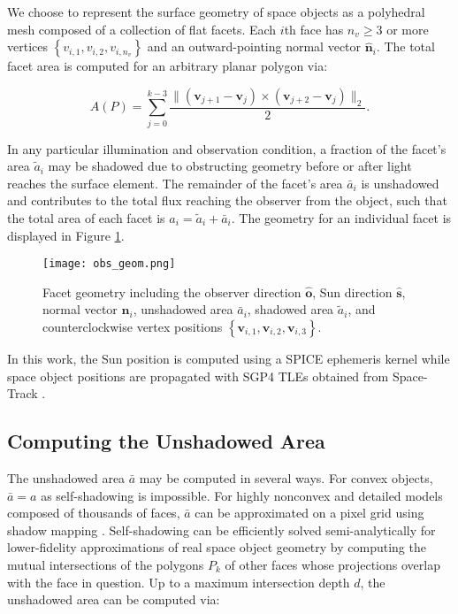 \documentclass[a4paper,twocolumn]{spaceDebrisC} %
\newcommand{\vctr}[1]{\bm{#1}}
\newcommand{\unitv}[1]{\hat{\vctr{#1}}}
\newcommand{\figmed}[0]{0.4\textwidth}
\begin{document}
We choose to represent the surface geometry of space objects as a polyhedral mesh composed of a collection of flat facets. Each $i$th face has $n_v \geq 3$ or more vertices $\left\{ v_{i,1}, v_{i,2}, v_{i,n_v} \right\}$ and an outward-pointing normal vector $\unitv{n}_i$. The total facet area is computed for an arbitrary planar polygon via:

\begin{equation} \label{eq:poly_area}
 A(P) = \sum_{j=0}^{k-3} \frac{\| \left( \vctr{v}_{j+1} - \vctr{v}_{j} \right) \times \left( \vctr{v}_{j+2} - \vctr{v}_{j} \right)\|_2}{2}.
 \end{equation} 
 
 In any particular illumination and observation condition, a fraction of the facet's area $\tilde{a}_i$ may be shadowed due to obstructing geometry before or after light reaches the surface element. The remainder of the facet's area $\bar{a}_i$ is unshadowed and contributes to the total flux reaching the observer from the object, such that the total area of each facet is $a_i = \tilde{a}_i + \bar{a}_i$. The geometry for an individual facet is displayed in Figure \ref{fig:facet_geom}.

\begin{figure}[H]
  \centering
  \texttt{[image: obs\_geom.png]}
  \caption{Facet geometry including the observer direction $\unitv{o}$, Sun direction $\unitv{s}$, normal vector $\unitv{n}_i$, unshadowed area $\bar{a}_i$, shadowed area $\tilde{a}_i$, and counterclockwise vertex positions $\left\{ \vctr{v}_{i,1}, \vctr{v}_{i,2}, \vctr{v}_{i,3} \right\}$.}
  \label{fig:facet_geom}
\end{figure}

In this work, the Sun position is computed using a SPICE ephemeris kernel \cite{spice} while space object positions are propagated with SGP4 TLEs obtained from Space-Track \cite{spacetrack}.

\subsection{Computing the Unshadowed Area}

The unshadowed area $\bar{a}$ may be computed in several ways. For convex objects, $\bar{a}=a$ as self-shadowing is impossible. For highly nonconvex and detailed models composed of thousands of faces, $\bar{a}$ can be approximated on a pixel grid using shadow mapping \cite{robinson2022}. Self-shadowing can be efficiently solved semi-analytically for lower-fidelity approximations of real space object geometry by computing the mutual intersections of the polygons $P_k$ of other faces whose projections overlap with the face in question. Up to a maximum intersection depth $d$, the unshadowed area can be computed via:
\end{document}
